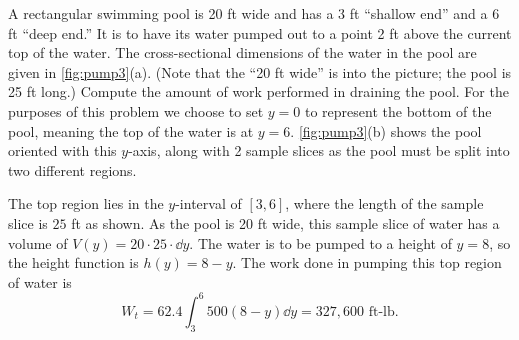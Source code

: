 \begin{example}\label{ex_pump3}
A rectangular swimming pool is 20 ft wide and has a 3 ft ``shallow end'' and a 6 ft ``deep end.'' It is to have its water pumped out to a point 2 ft above the current top of the water. The cross-sectional dimensions of the water in the pool are given in \autoref{fig:pump3}(a). (Note that the ``20 ft wide'' is into the picture; the pool is 25 ft long.) Compute the amount of work performed in draining the pool.
\solution
For the purposes of this problem we choose to set $y=0$ to represent the bottom of the pool, meaning the top of the water is at $y=6$.
\autoref{fig:pump3}(b) shows the pool oriented with this $y$-axis, along with 2 sample slices as the pool must be split into two different regions. 

The top region lies in the $y$-interval of $[3,6]$, where the length of the sample slice is $25$ ft as shown. As the pool is 20 ft wide, this sample slice of water has a volume of $V(y) = 20\cdot25\cdot\dd y$.  The water is to be pumped to a height of $y=8$, so the height function is $h(y) = 8-y$. The work done in pumping this top region of water is 
\[W_t = 62.4\int_3^6 500(8-y)\dd y = 327,600 \text{ ft-lb}.\]


\end{example}
